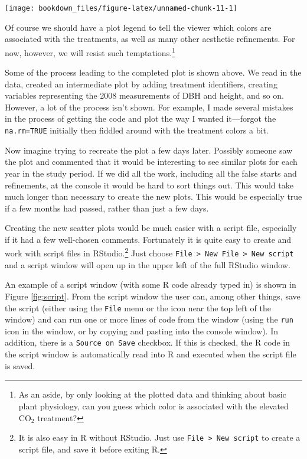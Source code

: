 \documentclass[]{krantz}
\begin{document}
\begin{center}\texttt{[image: bookdown\_files/figure-latex/unnamed-chunk-11-1]} \end{center}

Of course we should have a plot legend to tell the viewer which colors are associated with the treatments, as well as many other aesthetic refinements. For now, however, we will resist such temptations.\footnote{As an aside, by only looking at the plotted data and thinking about basic plant physiology, can you guess which color is associated with the elevated CO\(_2\) treatment?}

Some of the process leading to the completed plot is shown above. We read in the data, created an intermediate plot by adding treatment identifiers, creating variables representing the 2008 measurements of DBH and height, and so on. However, a lot of the process isn't shown. For example, I made several mistakes in the process of getting the code and plot the way I wanted it---forgot the \texttt{na.rm=TRUE} initially then fiddled around with the treatment colors a bit.

Now imagine trying to recreate the plot a few days later. Possibly someone saw the plot and commented that it would be interesting to see similar plots for each year in the study period. If we did all the work, including all the false starts and refinements, at the console it would be hard to sort things out. This would take much longer than necessary to create the new plots. This would be especially true if a few months had passed, rather than just a few days.

Creating the new scatter plots would be much easier with a script file, especially if it had a few well-chosen comments. Fortunately it is quite easy to create and work with script files in RStudio.\footnote{It is also easy in R without RStudio. Just use \texttt{File\ \textgreater{}\ New\ script} to create a script file, and save it before exiting R.} Just choose \texttt{File\ \textgreater{}\ New\ File\ \textgreater{}\ New\ script} and a script window will open up in the upper left of the full RStudio window.

An example of a script window (with some R code already typed in) is shown in Figure \ref{fig:script}. From the script window the user can, among other things, save the script (either using the \texttt{File} menu or the icon near the top left of the window) and can run one or more lines of code from the window (using the \texttt{run} icon in the window, or by copying and pasting into the console window). In addition, there is a \texttt{Source\ on\ Save} checkbox. If this is checked, the R code in the script window is automatically read into R and executed when the script file is saved.
\end{document}

